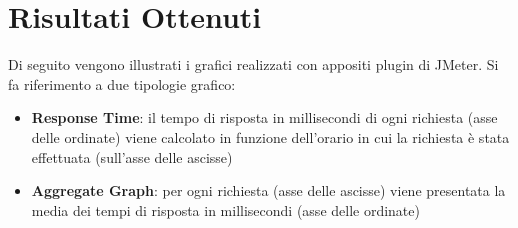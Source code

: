 
\section{Risultati Ottenuti}
Di seguito vengono illustrati i grafici realizzati con appositi plugin di JMeter. Si fa riferimento a due tipologie grafico:
\begin{itemize}
    \item \textbf{Response Time}: il tempo di risposta in millisecondi di ogni richiesta (asse delle ordinate) viene calcolato in funzione dell'orario in cui la richiesta è stata effettuata (sull'asse delle ascisse) 
    \item \textbf{Aggregate Graph}: per ogni richiesta (asse delle ascisse) viene presentata la media dei tempi di risposta in millisecondi (asse delle ordinate)
\end{itemize}


